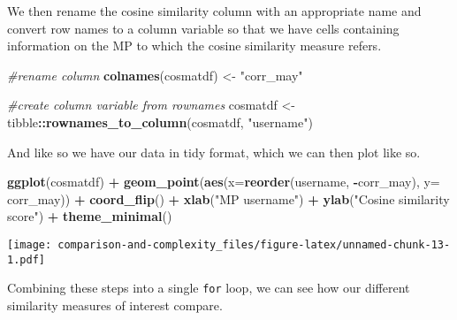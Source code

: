 \documentclass[
]{article}
\newenvironment{Shaded}{\begin{snugshade}}{\end{snugshade}}
\newcommand{\AttributeTok}[1]{\textcolor[rgb]{0.13,0.29,0.53}{#1}}
\newcommand{\CommentTok}[1]{\textcolor[rgb]{0.56,0.35,0.01}{\textit{#1}}}
\newcommand{\FunctionTok}[1]{\textcolor[rgb]{0.13,0.29,0.53}{\textbf{#1}}}
\newcommand{\NormalTok}[1]{#1}
\newcommand{\OtherTok}[1]{\textcolor[rgb]{0.56,0.35,0.01}{#1}}
\newcommand{\SpecialCharTok}[1]{\textcolor[rgb]{0.81,0.36,0.00}{\textbf{#1}}}
\newcommand{\StringTok}[1]{\textcolor[rgb]{0.31,0.60,0.02}{#1}}
\begin{document}
We then rename the cosine similarity column with an appropriate name and
convert row names to a column variable so that we have cells containing
information on the MP to which the cosine similarity measure refers.

\begin{Shaded}
\begin{Highlighting}[]
\CommentTok{\#rename column}
\FunctionTok{colnames}\NormalTok{(cosmatdf) }\OtherTok{\textless{}{-}} \StringTok{"corr\_may"}
  
\CommentTok{\#create column variable from rownames}
\NormalTok{cosmatdf }\OtherTok{\textless{}{-}}\NormalTok{ tibble}\SpecialCharTok{::}\FunctionTok{rownames\_to\_column}\NormalTok{(cosmatdf, }\StringTok{"username"}\NormalTok{)}
\end{Highlighting}
\end{Shaded}

And like so we have our data in tidy format, which we can then plot like
so.

\begin{Shaded}
\begin{Highlighting}[]
\FunctionTok{ggplot}\NormalTok{(cosmatdf) }\SpecialCharTok{+}
  \FunctionTok{geom\_point}\NormalTok{(}\FunctionTok{aes}\NormalTok{(}\AttributeTok{x=}\FunctionTok{reorder}\NormalTok{(username, }\SpecialCharTok{{-}}\NormalTok{corr\_may), }\AttributeTok{y=}\NormalTok{ corr\_may)) }\SpecialCharTok{+} 
  \FunctionTok{coord\_flip}\NormalTok{() }\SpecialCharTok{+}
  \FunctionTok{xlab}\NormalTok{(}\StringTok{"MP username"}\NormalTok{) }\SpecialCharTok{+}
  \FunctionTok{ylab}\NormalTok{(}\StringTok{"Cosine similarity score"}\NormalTok{) }\SpecialCharTok{+} 
  \FunctionTok{theme\_minimal}\NormalTok{()}
\end{Highlighting}
\end{Shaded}

\texttt{[image: comparison-and-complexity\_files/figure-latex/unnamed-chunk-13-1.pdf]}

Combining these steps into a single \texttt{for} loop, we can see how
our different similarity measures of interest compare.
\end{document}
